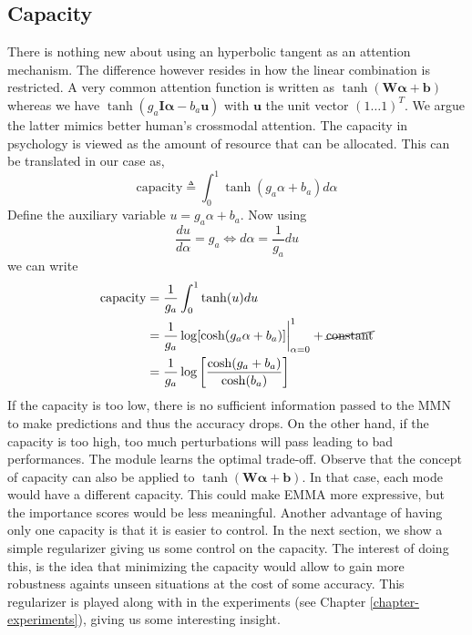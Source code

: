 \subsection*{Capacity}
There is nothing new about using an hyperbolic tangent as an attention mechanism. The difference however resides in how the linear combination is restricted. A very common attention function is written as $\tanh(\mathbf{W}\mathbf{\alpha}+\mathbf{b})$ whereas we have $\tanh(g_a\mathbf{I}\mathbf{\alpha}-b_a\mathbf{u})$ with $\mathbf{u}$ the unit vector $(1 \ldots 1)^T$. We argue the latter mimics better human's crossmodal attention. The capacity in psychology is viewed as the amount of resource that can be allocated. This can be translated in our case as,
\begin{equation}
\text{capacity} \triangleq \int_0^1 \tanh(g_a\alpha + b_a)d\alpha 
\end{equation}
Define the auxiliary variable $u = g_a\alpha + b_a$. Now using
\begin{equation}
\frac{du}{d\alpha} = g_a \Leftrightarrow d\alpha = \frac{1}{g_a}du
\end{equation}
we can write 
\begin{equation}
\begin{split}
\text{capacity} &= \frac{1}{g_a} \int_0^1 \tanh(u)du  \\
&= \frac{1}{g_a}\log[\cosh(g_a\alpha + b_a)]\bigg\rvert_{\alpha = 0}^1 + \cancel{\text{constant}} \\
&= \frac{1}{g_a}\log\bigg[\frac{\cosh(g_a + b_a)}{\cosh(b_a)}\bigg]
\end{split}
\end{equation}
If the capacity is too low, there is no sufficient information passed to the MMN to make predictions and thus the accuracy drops. On the other hand, if the capacity is too high, too much perturbations will pass leading to bad performances. The module learns the optimal trade-off. Observe that the concept of capacity can also be applied to $\tanh(\mathbf{W}\mathbf{\alpha}+\mathbf{b})$. In that case, each mode would have a different capacity. This could make EMMA more expressive, but the importance scores would be less meaningful. Another advantage of having only one capacity is that it is easier to control. In the next section, we show a simple regularizer giving us some control on the capacity. The interest of doing this, is the idea that minimizing the capacity would allow to gain more robustness againts unseen situations at the cost of some accuracy. This regularizer is played along with in the experiments (see Chapter \ref{chapter-experiments}), giving us some interesting insight.

